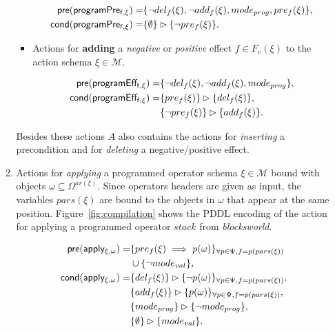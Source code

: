 \documentclass[letterpaper]{article} %
\newcommand{\pre}{\mathsf{pre}}     %
\newcommand{\cond}{\mathsf{cond}}   %
\begin{document}
\begin{itemize}
\begin{enumerate}
\begin{itemize}
\begin{small}
\begin{align*}
\hspace*{7pt}\pre(\mathsf{programPre_{f,\xi}})=&\{\neg del_{f}(\xi),\neg add_{f}(\xi), mode_{prog}, pre_{f}(\xi)\},\\
\cond(\mathsf{programPre_{f,\xi}})=&\{\emptyset\}\rhd\{\neg pre_{f}(\xi)\}.
\end{align*}
\end{small}

\item Actions for {\bf adding} a {\em negative} or {\em positive} effect $f\in F_v(\xi)$ to the action schema $\xi\in\mathcal{M}$.

\begin{small}
\begin{align*}
\hspace*{7pt}\pre(\mathsf{programEff_{f,\xi}})=&\{\neg del_{f}(\xi),\neg add_{f}(\xi), mode_{prog}\},\\
\cond(\mathsf{programEff_{f,\xi}})=&\{pre_{f}(\xi)\}\rhd\{del_{f}(\xi)\},\\
&\{\neg pre_{f}(\xi)\}\rhd\{add_{f}(\xi)\}.
\end{align*}
\end{small}
\end{itemize}
Besides these actions $A$ also contains the actions for {\em inserting} a precondition and for {\em deleting} a negative/positive effect.


\item Actions for {\em applying} a programmed operator schema $\xi\in\mathcal{M}$ bound with objects $\omega\subseteq\Omega^{ar(\xi)}$. Since operators headers are given as input, the variables $pars(\xi)$ are bound to the objects in $\omega$ that appear at the same position. Figure~\ref{fig:compilation} shows the PDDL encoding of the action for applying a programmed operator $stack$ from {\em blocksworld}.
\begin{small}
\begin{align*}
\hspace*{7pt}\pre(\mathsf{apply_{\xi,\omega}})=&\{pre_{f}(\xi)\implies p(\omega)\}_{\forall p\in\Psi,f=p(pars(\xi))}\\
&\cup \{\neg mode_{val}\},\\
\cond(\mathsf{apply_{\xi,\omega}})=&\{del_{f}(\xi)\}\rhd\{\neg p(\omega)\}_{\forall p\in\Psi,f=p(pars(\xi))},\\
&\{add_{f}(\xi)\}\rhd\{p(\omega)\}_{\forall p\in\Psi,f=p(pars(\xi))},\\
&\{mode_{prog}\}\rhd\{\neg mode_{prog}\},\\
&\{\emptyset\}\rhd\{mode_{val}\}.
\end{align*}
\end{small}


\end{enumerate}
\end{itemize}
\end{document}
